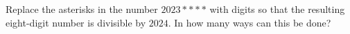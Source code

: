 Replace the asterisks in the number $2023****$ with digits so that the resulting eight-digit number is divisible by $2024$. In how many ways can this be done?
